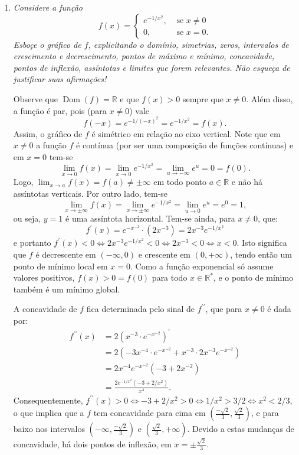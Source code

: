 \documentclass[12pt,a4paper]{article}
\newcommand*\dom[1]{\operatorname{Dom}\left(#1\right)}
\newcommand*\R{\mathbb{R}}
\begin{document}
\begin{enumerate}
\item \textit{ Considere a função \[f(x) = \begin{cases}
e^{-1 / x^2}, & \text{ se } x \neq 0 \\
0, & \text{ se } x=0.
\end{cases}\] Esboçe o gráfico de $f$, explicitando o domínio, simetrias, zeros, intervalos de crescimento e decrescimento, pontos de máximo e mínimo, concavidade, pontos de inflexão, assíntotas e limites que forem relevantes. Não esqueça de justificar suas afirmações!}

Observe que $\dom{f} = \R$ e que $f(x) > 0$ sempre que $x \neq 0$. Além disso, a função é par, pois (para $x \neq 0$) vale
\[
f(-x)
= e^{-1 / (-x)^2}
= e^{-1 / x^2}
= f(x).
\]
Assim, o gráfico de $f$ é simétrico em relação ao eixo vertical. Note que em $x \neq 0$ a função $f$ é contínua (por ser uma composição de funções contínuas) e em $x=0$ tem-se
\[
\lim_{x \to 0} f(x)
= \lim_{x \to 0} e^{-1 / x^2}
= \lim_{u \to -\infty} e^u
= 0
= f(0).
\]
Logo, $\lim_{x \to a} f(x) = f(a) \neq \pm \infty$ em todo ponto $a \in \R$ e não há assíntotas verticais. Por outro lado, tem-se
\[
\lim_{x \to \pm \infty} f(x)
= \lim_{x \to \pm \infty} e^{-1 / x^2}
= \lim_{u \to 0} e^u
= e^0
= 1,
\]
ou seja, $y=1$ é uma assíntota horizontal. Tem-se ainda, para $x \neq 0$, que:
\[
f^\prime(x)
= e^{-x^{-2}} \cdot (2x^{-3})
= 2 x^{-3} e^{-1/x^2}
\]
e portanto $
f^\prime(x) < 0
\Leftrightarrow 2 x^{-3} e^{-1/x^2} < 0
\Leftrightarrow 2 x^{-3} < 0
\Leftrightarrow x < 0$. Isto significa que $f$ é decrescente em $(-\infty, 0)$ e crescente em $(0,+\infty)$, tendo então um ponto de mínimo local em $x = 0$. Como a função exponencial só assume valores positivos, $f(x) > 0 = f(0)$ para todo $x \in \R^*$, e o ponto de mínimo também é um mínimo global.

A concavidade de $f$ fica determinada pelo sinal de $f^{\prime\prime}$, que para $x \neq 0$ é dada por:
\begin{align*}
f^{\prime\prime}(x)
& = 2(x^{-3} \cdot e^{-x^{-2}})^\prime \\
& = 2( -3 x^{-4} \cdot e^{-x^{-2}}
  + x^{-3} \cdot 2 x^{-3} e^{-x^{-2}} ) \\
& = 2 x^{-4} e^{-x^{-2}} (-3 + 2 x^{-2}) \\
& = \frac{ 2 e^{-1/x^2} (-3 + 2/x^2) }{ x^{4} }.
\end{align*}
Consequentemente, $f^{\prime\prime}(x) > 0 \Leftrightarrow -3 + 2/x^{2} > 0 \Leftrightarrow 1/x^{2} > 3/2 \Leftrightarrow x^2 < 2/3$, o que implica que a $f$ tem concavidade para cima em $\left( \frac{-\sqrt{2}}{3},\frac{\sqrt{2}}{3}\right)$, e para baixo nos intervalos $\left( -\infty, \frac{-\sqrt{2}}{3} \right)$ e $\left( \frac{\sqrt{2}}{3}, +\infty\right)$. Devido a estas mudanças de concavidade, há dois pontos de inflexão, em $x = \pm\frac{\sqrt{2}}{3}$.


\end{enumerate}
\end{document}
